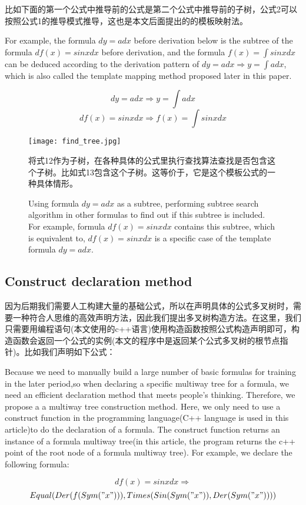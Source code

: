 \documentclass[runningheads]{llncs}
\begin{document}
比如下面的第一个公式中推导前的公式是第二个公式中推导前的子树，公式2可以按照公式1的推导模式推导，这也是本文后面提出的的模板映射法。

For example, the formula $dy=adx$ before derivation below is the subtree of the formula $df(x)=sinxdx$ before derivation, and the formula $f(x)=\int{sinxdx}$ can be deduced according to the derivation pattern of $dy=adx \Rightarrow y=\int{adx}$, which is also called the template mapping method proposed later in this paper.

$$dy=adx \Rightarrow y=\int{adx} $$
$$df(x)=sinxdx \Rightarrow f(x)=\int{sinxdx} $$

\begin{figure}[H]
\centering
\texttt{[image: find\_tree.jpg]}
\caption{将式12作为子树，在各种具体的公式里执行查找算法查找是否包含这个子树。比如式13包含这个子树。这等价于，它是这个模板公式的一种具体情形。}
\caption{Using formula $dy=adx$ as a subtree, performing subtree search algorithm in other formulas to find out if this subtree is included. For example, formula $df(x)=sinxdx$ contains this subtree, which is equivalent to, $df(x)=sinxdx$ is a specific case of the template formula $dy=adx$.}
\end{figure}



\subsection{Construct declaration method}
因为后期我们需要人工构建大量的基础公式，所以在声明具体的公式多叉树时，需要一种符合人思维的高效声明方法，因此我们提出多叉树构造方法。在这里，我们只需要用编程语句(本文使用的c++语言)使用构造函数按照公式构造声明即可，构造函数会返回一个公式的实例(本文的程序中是返回某个公式多叉树的根节点指针)。比如我们声明如下公式：

Because we need to manually build a large number of basic formulas for training in the later period,so when declaring a specific multiway tree for a formula, we need an efficient declaration method that meets people's thinking. Therefore, we propose a a multiway  tree construction method. Here, we only need to use a construct function in the programming language(C++ language is used in this article)to do the declaration of a formula. The construct function returns an instance of a formula multiway tree(in this article, the program returns the c++ point of the root node of a formula multiway tree). For example, we declare the following formula:

$$df(x)=sinxdx \Rightarrow$$
$$Equal(Der(f(Sym("x"))), Times(Sin(Sym("x")),Der(Sym("x"))))$$
\end{document}
